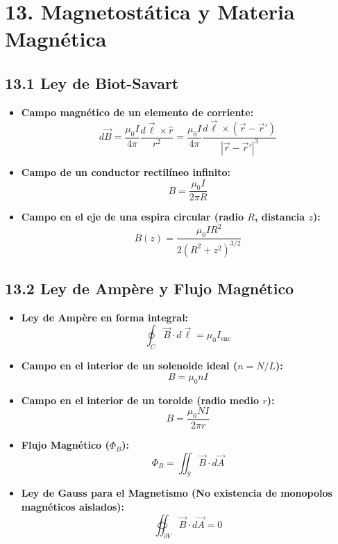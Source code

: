 \documentclass[11pt,a4paper]{article}
\begin{document}
\section*{13. Magnetostática y Materia Magnética}

\subsection*{13.1 Ley de Biot-Savart}

\begin{itemize}
  \item \textbf{Campo magnético de un elemento de corriente:}
  \[
    d\vec{B} = \frac{\mu_0 I}{4\pi} \frac{d\vec{\ell} \times \hat{r}}{r^2} = \frac{\mu_0 I}{4\pi} \frac{d\vec{\ell} \times (\vec{r} - \vec{r}')}{|\vec{r} - \vec{r}'|^3}
  \]
  \item \textbf{Campo de un conductor rectilíneo infinito:}
  \[
    B = \frac{\mu_0 I}{2\pi R}
  \]
  \item \textbf{Campo en el eje de una espira circular (radio $R$, distancia $z$):}
  \[
    B(z) = \frac{\mu_0 I R^2}{2(R^2 + z^2)^{3/2}}
  \]
\end{itemize}

\subsection*{13.2 Ley de Ampère y Flujo Magnético}

\begin{itemize}
  \item \textbf{Ley de Ampère en forma integral:}
  \[
    \oint_C \vec{B} \cdot d\vec{\ell} = \mu_0 I_{\mathrm{enc}}
  \]
  \item \textbf{Campo en el interior de un solenoide ideal ($n = N/L$):}
  \[
    B = \mu_0 n I
  \]
  \item \textbf{Campo en el interior de un toroide (radio medio $r$):}
  \[
    B = \frac{\mu_0 N I}{2\pi r}
  \]
  \item \textbf{Flujo Magnético ($\Phi_B$):}
  \[
    \Phi_B = \iint_S \vec{B} \cdot d\vec{A}
  \]
  \item \textbf{Ley de Gauss para el Magnetismo (No existencia de monopolos magnéticos aislados):}
  \[
    \oiint_{\partial V} \vec{B} \cdot d\vec{A} = 0
  \]
\end{itemize}
\end{document}
